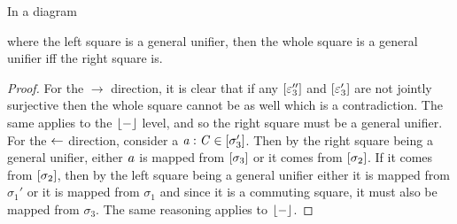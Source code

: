 \begin{lemma}\label{lem:general-unifier-pasting-law}
    In a diagram
    where the left square is a general unifier,  
    then the whole square is a general unifier iff the right square is.
\end{lemma}
\begin{proof}
    For the $\to$ direction, it is clear that if any $[\varepsilon_3'']$ and $[\varepsilon_3']$ are not jointly surjective then the whole square cannot be as well which is a contradiction.
    The same applies to the $\lfloor-\rfloor$ level, and so the right square must be a general unifier.
    \nl
    For the $\leftarrow$ direction, consider a $\mathit{a} : \mathit{C} \in [\sigma_3']$.
    Then by the right square being a general unifier, either $\mathit{a}$ is mapped from $[\sigma_3]$ or it comes from $[\sigma_2]$.
    If it comes from $[\sigma_2]$, then by the left square being a general unifier either it is mapped from $\sigma_1'$ or it is mapped from $\sigma_1$ and since it is a commuting square, it must also be mapped from $\sigma_3$.
    The same reasoning applies to $\lfloor-\rfloor$.
\end{proof}

